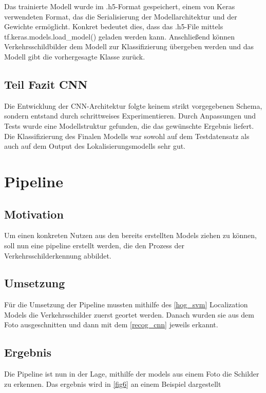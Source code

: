 \documentclass[runningheads]{llncs}
\begin{document}
Das trainierte Modell wurde im .h5-Format gespeichert, einem von Keras verwendeten Format, das die Serialisierung der
Modellarchitektur und der Gewichte ermöglicht. Konkret bedeutet dies, dass das .h5-File mittels tf.keras.models.load\_model()
geladen werden kann. Anschließend können Verkehrsschildbilder dem Modell zur Klassifizierung übergeben werden und das Modell
gibt die vorhergesagte Klasse zurück.

\subsection{Teil Fazit CNN}
Die Entwicklung der CNN-Architektur folgte keinem strikt vorgegebenen Schema, sondern entstand durch schrittweises Experimentieren.
Durch Anpassungen und Tests wurde eine Modellstruktur gefunden, die das gewünschte Ergebnis liefert. Die Klassifizierung des
Finalen Modells war sowohl auf dem Testdatensatz als auch auf dem Output des Lokalisierungsmodells sehr gut.

\section{Pipeline}

\subsection{Motivation}

Um einen konkreten Nutzen aus den bereits erstellten Models ziehen zu können, soll nun eine pipeline erstellt werden, die den Prozess der Verkehrsschilderkennung abbildet. 

\subsection{Umsetzung}

Für die Umsetzung der Pipeline mussten mithilfe des \ref{hog_svm} Localization Models die Verkehrsschilder zuerst geortet werden. Danach wurden sie aus dem Foto ausgeschnitten und dann mit dem \ref{recog_cnn} jeweils erkannt. 

\subsection{Ergebnis}

Die Pipeline ist nun in der Lage, mithilfe der models aus einem Foto die Schilder zu erkennen. Das ergebnis wird in \ref{fig6} an einem Beispiel dargestellt
\end{document}
